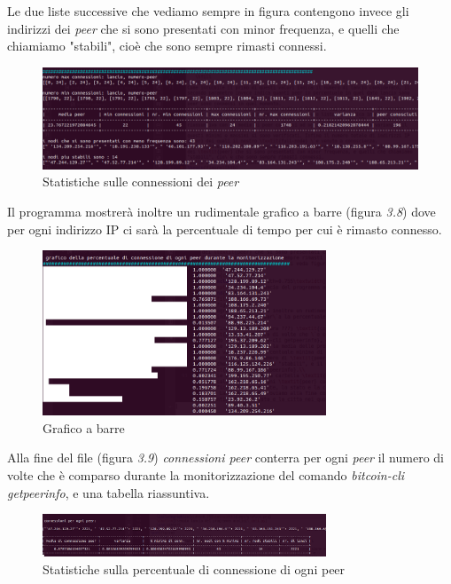 Le due liste successive che vediamo sempre in figura contengono invece gli indirizzi dei \textit{peer} che si sono presentati con minor frequenza, e quelli che chiamiamo "stabili", cio\`e che sono sempre rimasti connessi.
\begin{figure}[htb]
\begin{center}
   \includegraphics[width=1.000\textwidth]{imgs/tabella1.png}
   \caption{Statistiche sulle connessioni dei \textit{peer}}
   \end{center}
   \hfill
\end{figure}
Il programma mostrer\`a inoltre un rudimentale grafico a barre (figura \textit{3.8}) dove per ogni indirizzo IP ci sar\`a la percentuale di tempo per cui \`e rimasto connesso.
\begin{figure}[htb]
\begin{center}
   \includegraphics[width=0.755\textwidth]{imgs/grafico.png}
   \caption{Grafico a barre}
   \end{center}
   \hfill
\end{figure}
Alla fine del file (figura \textit{3.9}) \textit{connessioni peer} conterra per ogni \textit{peer} il numero di volte che \`e comparso durante la monitorizzazione del comando \textit{bitcoin-cli getpeerinfo}, e una tabella riassuntiva.
\begin{figure}[htb]
\begin{center}
   \includegraphics[width=0.755\textwidth]{imgs/tabella2.png}
   \caption{Statistiche sulla percentuale di connessione di ogni peer}
   \end{center}
   \hfill
\end{figure}
